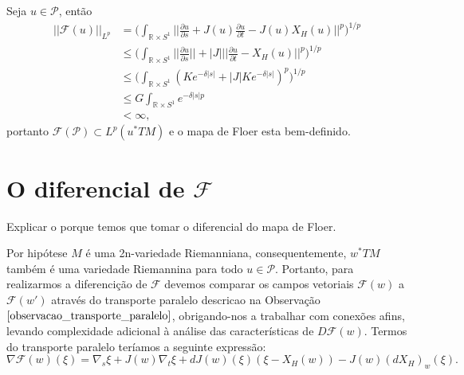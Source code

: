 \documentclass[12pt]{book}
\newcommand{\caminhosexponenciaisconectantesabrev}{\mathcal{P}}
\newcommand{\circulo}{S^{1}}
\newcommand{\derivadaparcial}[2]{\frac{\partial #1}{\partial #2}}
\newcommand{\mapafloer}{\mathcal{F}}
\newcommand{\mapafloerdefinicao}[1]{\derivadaparcial{#1}{s} + J(#1)\derivadaparcial{#1}{t} - J(#1)X_{H}(#1)}
\newcommand{\mapafloerparametro}[1]{\mathcal{F}(#1)}
\newcommand{\mapafloerpadrao}{\mapafloerparametro{u}}
\newcommand{\normagrande}[1]{\Big|\Big|#1\Big|\Big|}
\newcommand{\normaLp}[1]{||#1||_{L^{p}}}
\newcommand{\normaLpdefinicao}[2]{ \Big(\int_{#2}#1^{p}\Big)^{1/p}}
\newcommand{\normagrandeLpdefinicao}[2]{ \normaLpdefinicao{\normagrande{#1}}{#2}}
\newcommand{\pullbackfibradotangente}[2]{#1^{*}T#2}
\newcommand{\pullbackfibradotangenteM}[1]{\pullbackfibradotangente{#1}{M}}
\newcommand{\pullbackfibradotangenteMpadrao}{\pullbackfibradotangente{u}{M}}
\newcommand{\retacartesianocirculo}{\real{} \times \circulo}
\newcommand{\real}[1]{\mathbb{R}^{#1}}
\newcommand{\vermelho}[1]{{\color{red}#1}}
\begin{document}
	Seja $u \in \caminhosexponenciaisconectantesabrev$, então
	$$
	\begin{aligned}
	\normaLp{\mapafloerpadrao} &= \normagrandeLpdefinicao{\mapafloerdefinicao{u}}{\retacartesianocirculo}
	\\
	&\leq \normaLpdefinicao{\normagrande{\derivadaparcial{u}{s}} +|J|\normagrande{\derivadaparcial{u}{t} - X_{H}(u)}}{\retacartesianocirculo}
	\\
	&\leq \normaLpdefinicao{(Ke^{-\delta|s|} +|J|Ke^{-\delta|s|})}{\retacartesianocirculo}
	\\
	&\leq G \int_{\retacartesianocirculo}e^{-\delta|s|p}
	\\
	&< \infty,
	\end{aligned}	
	$$ 
	portanto $\mapafloerparametro{\caminhosexponenciaisconectantesabrev} \subset L^{p}(\pullbackfibradotangenteMpadrao)$ e o mapa de Floer esta bem-definido.
	
	\section{O diferencial de $\mapafloer$}
	\vermelho{Explicar o porque temos que tomar o diferencial do mapa de Floer.}
	

	
	Por hipótese $M$ é uma 2n-variedade Riemanniana, consequentemente, $\pullbackfibradotangenteM{w}$ também é uma variedade Riemannina para todo $u \in \caminhosexponenciaisconectantesabrev$. Portanto, para realizarmos a diferencição de $\mapafloer$ devemos comparar os campos vetoriais $\mapafloerparametro{w}$ a $\mapafloerparametro{w'}$ através do transporte paralelo descricao na Observação $\ref{observacao_transporte_paralelo}$, obrigando-nos a trabalhar com conexões afins, levando complexidade adicional à análise das características de $D\mapafloer(w)$. Termos do transporte paralelo teríamos a seguinte expressão:
	$$
	\nabla\mapafloerparametro{w}(\xi) = \nabla_{s}\xi + J(w)\nabla_{t}\xi + dJ(w)(\xi)(\xi - X_{H}(w)) - J(w)(dX_{H})_{w}(\xi).
	$$ 
	
\end{document}
